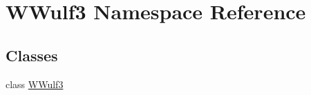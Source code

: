 \hypertarget{namespaceWWulf3}{\section{W\-Wulf3 Namespace Reference}
\label{namespaceWWulf3}
}
\subsection*{Classes}
\begin{DoxyCompactItemize}
\item 
class \hyperlink{classWWulf3_1_1WWulf3}{W\-Wulf3}
\end{DoxyCompactItemize}
